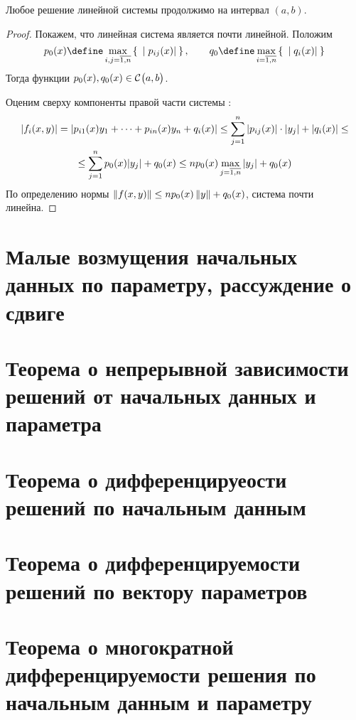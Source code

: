 \begin{theorem}
    Любое решение линейной системы  продолжимо на интервал $ (a, b) $.
\end{theorem}

\begin{proof}
	Покажем, что линейная система является почти линейной. Положим
    $$ p_0(x) \define \max\limits_{i, j = \ol{1, n}} \set{|p_{ij}(x)|}, \qquad q_0 \define \max\limits_{i = \ol{1, n}} \set{|q_i(x)|} $$
    Тогда функции $ p_0(x), q_0(x) \in \mathcal{C}^{} \big( {a, b} \big)  $.

    Оценим сверху компоненты правой части системы :
    \begin{multline*}
        |f_i(x, y)| = |p_{i1}(x)y_1 + \dots + p_{in}(x)y_n + q_i(x)| \le \sum_{j = 1}^n |p_{ij}(x)| \cdot |y_j| + |q_i(x)| \le \\
        \le \sum_{j = 1}^n p_0(x) |y_j| + q_0(x) \le np_0(x) \max\limits_{j = \overline{1, n}}|y_j| + q_0(x)
    \end{multline*}
    По определению нормы $ \left\|{f(x, y)}\right\| \le np_0(x)\left\|{y}\right\| + q_0(x) $, \ie система  почти линейна.
\end{proof}

\section{Малые возмущения начальных данных по параметру, рассуждение о сдвиге}



\section{Теорема о непрерывной зависимости решений от начальных данных и параметра}

\section{Теорема о дифференцируеости решений по начальным данным}

\section{Теорема о дифференцируемости решений по вектору параметров}

\section{Теорема о многократной дифференцируемости решения по начальным данным и параметру}


